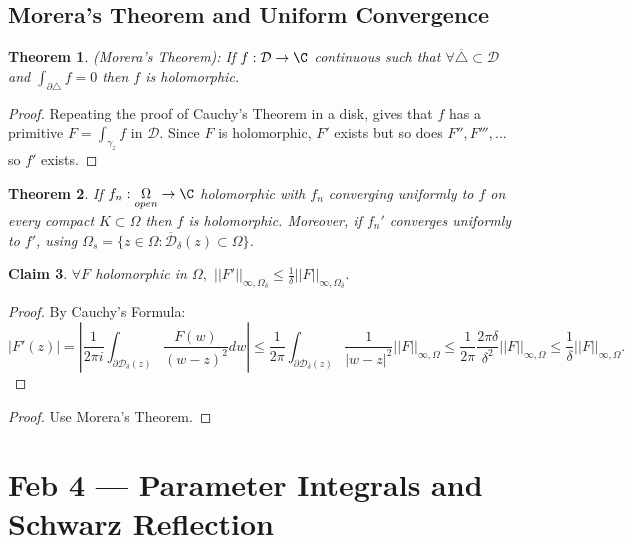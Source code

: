 \documentclass[a4paper]{article}
\newtheorem{thm}{Theorem}[section]
\newtheorem{claim}[thm]{Claim}
\begin{document}
\subsection{Morera's Theorem and Uniform Convergence}
\begin{thm}
    (Morera's Theorem): If $f:\mathcal{D}\to \C$ continuous such that $\forall \overline{\triangle}\subset \mathcal{D}$ and $\int_{\partial \triangle}f=0$ then $f$ is holomorphic. 
\end{thm}
\begin{proof}
    Repeating the proof of Cauchy's Theorem in a disk, gives that $f$ has a primitive $F=\int_{\gamma_z}f$ in $\mathcal{D}.$ Since $F$ is holomorphic, $F'$ exists but so does $F'',F''',...$ so $f'$ exists. 
\end{proof}
\begin{thm}
    If $f_n:\underset{open}{\Omega}\to \C$ holomorphic with $f_n$ converging uniformly to $f$ on every compact $K\subset \Omega$ then $f$ is holomorphic. 
    \noindent Moreover, if $f_n'$ converges uniformly to $f'$, using $\Omega_s= \{z\in \Omega: \overline{\mathcal{D}}_\delta(z)\subset \Omega\}$. \\
\end{thm}
\begin{claim}
    $\forall F$ holomorphic in $\Omega,$ $||F'||_{\infty,\Omega_\delta}\leq \frac{1}{\delta}||F||_{\infty, \Omega_\delta}.$ 
\end{claim} 
\begin{proof}
    By Cauchy's Formula:\[
    |F'(z)|=\left | \frac{1}{2\pi i}\int_{\partial \mathcal{D}_\delta(z)}\frac{F(w)}{(w-z)^2}dw\right |\leq \frac{1}{2\pi}\int_{\partial \mathcal{D}_\delta(z)}\frac{1}{|w-z|^2}||F||_{\infty,\Omega}\leq \frac{1}{2\pi} \frac{2\pi \delta}{\delta^2}||F||_{\infty,\Omega}\leq \frac{1}{\delta}||F||_{\infty,\Omega}
    .\] 
\end{proof}
\begin{proof}
    Use Morera's Theorem. 
\end{proof}
\newpage
\section{Feb 4 --- Parameter Integrals and Schwarz Reflection}
\end{document}
